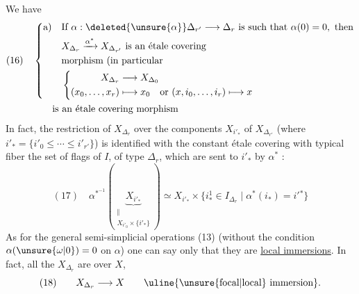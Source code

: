 We have
\[
\begin{aligned}
(16)\quad&
\left\{\begin{aligned}
\text{a)}\quad&\text{If }\alpha:\deleted{\unsure{\alpha}}\Delta_{r'}\longrightarrow\Delta_r\text{ is such that }\alpha(0)=0,\text{ then}\\
&X_{\Delta_r}\xrightarrow{\alpha^*}X_{\Delta_{r'}}\text{ is an étale covering}\\
&\text{morphism (in particular}\\
&\left\{\begin{aligned}
X_{\Delta_r}&\longrightarrow X_{\Delta_0}\\
(x_0,\ldots,x_r)&\longmapsto x_0\quad\text{or }(x,i_0,\ldots,i_r)\longmapsto x
\end{aligned}\right.
\end{aligned}\right.\\
&\qquad\text{is an étale covering morphism}
\end{aligned}
\]
In fact, the  restriction of $X_{\Delta_r}$
over the components $X_{i'_*}$  of $X_{\Delta_{r'}}$
(where $i'_* = \{i'_0\leq\cdots\leq i'_{r'}\}$)  is identified
with the constant étale covering with typical fiber the set
of flags  of $I$, of type $\Delta_r$, which
are sent to $i'_*$ by $\alpha^*$ :
\[
(17)\quad\alpha^{*^{-1}}\left(\underbrace{X_{i'_*}}_{\substack{\Vert\\X_{i'_0}\times\{i'_*\}}}\right)
\simeq X_{i'_*}\times\{i^1_*\in I_{\Delta_r}\mid\alpha^*(i_*)=i'{}^*\}
\]
As for the general semi-simplicial
operations (13) (without the condition $\alpha(\unsure{\omega|0})=0$ on
$\alpha$) one can say only that they are
\uline{local immersions}. In fact, all the
$X_{\Delta_r}$ are over $X$, 
\[
(18)\qquad X_{\Delta_r}\longrightarrow X\qquad\text{\uline{\unsure{focal|local} immersion}}.
\]
